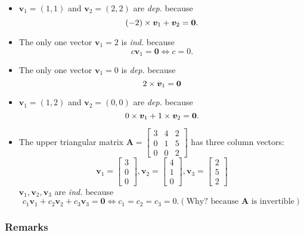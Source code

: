\begin{example}
\begin{itemize}
\item
$\bm v_1=(1,1)$ and $\bm v_2 = (2,2)$ are \emph{dep.} because
\[
(-2)\times\bm v_1 + \bm v_2 = \bm 0.
\]
\item
The only one vector $\bm v_1=2$ is \emph{ind.} because 
\[
c\bm v_1 = \bm 0
\Longleftrightarrow
c=0.
\]
\item
The only one vector $\bm v_1=0$ is \emph{dep.} because
\[
2\times\bm v_1 = \bm 0
\]
\item
$\bm v_1 = (1,2)$ and $\bm v_2 = (0,0)$ are \emph{dep.} because
\[
0\times\bm v_1 + 1\times\bm v_2 = \bm 0.
\]
\item
The upper triangular matrix $\bm A = \begin{bmatrix}
3&4&2\\0&1&5\\0&0&2
\end{bmatrix}$ has three column vectors:
\[
\bm v_1 = \begin{bmatrix}
3\\0\\0
\end{bmatrix},\bm v_2 = \begin{bmatrix}
4\\1\\0
\end{bmatrix},\bm v_3 = \begin{bmatrix}
2\\5\\2
\end{bmatrix}
\]
$\bm v_1,\bm v_2,\bm v_3$ are \emph{ind.} because
\[
c_1\bm v_1 + c_2\bm v_2 + c_3\bm v_3 = \bm 0
\Longleftrightarrow
c_1=c_2=c_3=0. (\text{Why? because $\bm A$ is invertible})
\]
\end{itemize}
\end{example}
\subsubsection{Remarks}
